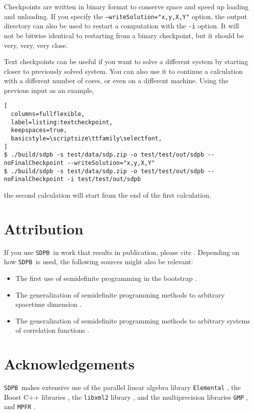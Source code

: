 \documentclass[12pt]{article}
\numberwithin{equation}{section}
\newcommand\SDPB{\texttt{SDPB}}
\begin{document}
Checkpoints are written in binary format to conserve space and speed
up loading and unloading.  If you specify the \texttt{--writeSolution="x,y,X,Y"}
option, the output directory can also be used to restart a computation
with the \texttt{-i} option.  It will not be bitwise identical to
restarting from a binary checkpoint, but it should be very, very, very
close.

Text checkpoints can be useful if you want to solve a different system
by starting closer to previously solved system.  You can also use it
to continue a calculation with a different number of cores, or even on
a different machine.  Using the previous input as an example,

\begin{lstlisting}[
  columns=fullflexible,
  label=listing:textcheckpoint,
  keepspaces=true,
  basicstyle=\scriptsize\ttfamily\selectfont,
]
$ ./build/sdpb -s test/data/sdp.zip -o test/test/out/sdpb --noFinalCheckpoint --writeSolution="x,y,X,Y"
$ ./build/sdpb -s test/data/sdp.zip -o test/test/out/sdpb --noFinalCheckpoint -i test/test/out/sdpb
\end{lstlisting}
the second calculation will start from the end of the first calculation.

\section{Attribution}

If you use \SDPB\ in work that results in publication, please cite \cite{DSD}. Depending on how \SDPB\ is used, the following sources might also be relevant:
\begin{itemize}
\item The first use of semidefinite programming in the bootstrap \cite{Poland:2011ey}.
\item The generalization of semidefinite programming methods to arbitrary
spacetime dimension \cite{Kos:2013tga}.
\item The generalization of semidefinite programming methods to arbitrary
systems of correlation functions \cite{Kos:2014bka}.
\end{itemize}

\section{Acknowledgements}

\SDPB\ makes extensive use of the parallel linear algebra library
\texttt{Elemental} \cite{Elemental}, the Boost C++
libraries \cite{BoostSite}, the \texttt{libxml2} library
\cite{libxml2}, and the multiprecision libraries \texttt{GMP}
\cite{GMP}, and \texttt{MPFR}
\cite{MPFR}.
\end{document}
